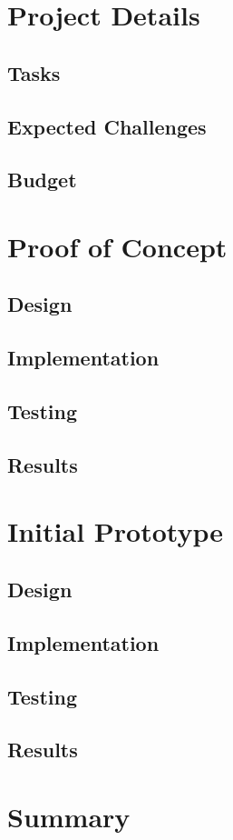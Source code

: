 \documentclass[12pt,a4paper,titlepage]{article}
\begin{document}
\section{Project Details}\label{sec:details}
\blindtext
\subsection{Tasks}
\blindtext
\subsection{Expected Challenges}
\blindtext
\subsection{Budget}
\blindtext


\section{Proof of Concept}\label{sec:proof_concept}
\blindtext
\subsection{Design}
\blindtext
\subsection{Implementation}
\blindtext
\subsection{Testing}
\blindtext
\subsection{Results}
\blindtext

\section{Initial Prototype}\label{sec:intital_proto}
\blindtext
\subsection{Design}
\blindtext
\subsection{Implementation}
\blindtext
\subsection{Testing}
\blindtext
\subsection{Results}
\blindtext

\section{Summary}\label{sec:summary}
\Blindtext

\newpage

\raggedright

\end{document}
